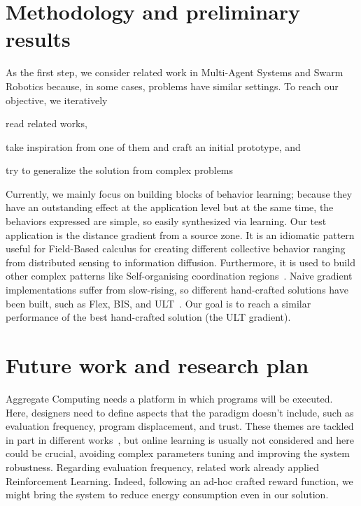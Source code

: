 \documentclass[conference]{IEEEtran}
\begin{document}
\section{Methodology and preliminary results}
%
As the first step, we consider related work in Multi-Agent Systems and Swarm Robotics because, in some cases, problems have similar settings.
To reach our objective, we iteratively 
\begin{enumerate*}[label=(\roman*)]
\item read related works,
\item take inspiration from one of them and craft an initial prototype, and
\item try to generalize the solution from complex problems
\end{enumerate*}
%
Currently, we mainly focus on building blocks of behavior learning; because they have an outstanding effect at the application level but
at the same time, the behaviors expressed are simple, so easily synthesized via learning.  %
%
Our test application is the distance gradient from a source zone. 
It is an idiomatic pattern useful for Field-Based calculus for creating different collective behavior ranging from distributed sensing to information diffusion.
Furthermore, it is used to build other complex patterns like Self-organising coordination regions~\cite{DBLP:conf/coordination/CasadeiPVN19}.
%
Naive gradient implementations suffer from slow-rising, so different hand-crafted solutions have been built, such as Flex, BIS, and ULT~\cite{DBLP:conf/saso/AudritoCDV17}.
Our goal is to reach a similar performance of the best hand-crafted solution (the ULT gradient).
%
%
\section{Future work and research plan}
Aggregate Computing needs a platform in which programs will be executed. 
Here, designers need to define aspects that the paradigm doesn't include, 
such as evaluation frequency, program displacement, and trust. 
These themes are tackled in part in different works~\cite{DBLP:journals/scp/CasadeiAV18, DBLP:journals/fi/CasadeiPPVW20, DBLP:journals/corr/abs-2012-13806}, 
but online learning is usually not considered and here could be crucial, 
avoiding complex parameters tuning and improving the system robustness.
Regarding evaluation frequency, related work already applied Reinforcement Learning. 
Indeed, following an ad-hoc crafted reward function, we might bring the system to reduce energy 
consumption even in our solution.



\end{document}
